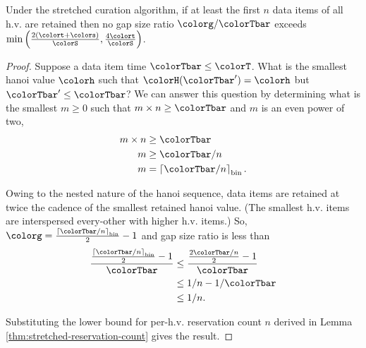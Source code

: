 \begin{theorem}
\label{thm:stretched-gap-size}
Under the stretched curation algorithm, if at least the first $n$ data items of all h.v. are retained then no gap size ratio $\colorg/\colorTbar$ exceeds $\min\Big(
  \frac{2(\colort + \colors)}{\colorS},
  \frac{4\colort}{\colorS}
\Big)$.
\end{theorem}
\begin{proof}

Suppose a data item time $\colorTbar \leq \colorT$.
What is the smallest hanoi value $\colorh$ such that $\colorH(\colorTbar') = \colorh$ but $\colorTbar' \leq \colorTbar$?
We can answer this question by determining what is the smallest $m \geq 0$ such that $m \times n \geq \colorTbar$ and $m$ is an even power of two,
\begin{align*}
m \times n
&\geq \colorTbar\\
m
&\geq \colorTbar / n\\
m
&= \left\lceil \colorTbar / n \right\rceil_{\mathrm{bin}}.
\end{align*}

Owing to the nested nature of the hanoi sequence, data items are retained at twice the cadence of the smallest retained hanoi value.
(The smallest h.v. items are interspersed every-other with higher h.v. items.)
So, $\colorg = \frac{\left\lceil \colorTbar / n \right\rceil_{\mathrm{bin}}}{2} - 1$ and gap size ratio is less than
\begin{align*}
\frac{
\frac{\left\lceil \colorTbar / n \right\rceil_{\mathrm{bin}}}{2} - 1
}{
\colorTbar
}
&\leq
\frac{
\frac{2\colorTbar / n}{2} - 1
}{
\colorTbar
}\\
&\leq
1 / n - 1 / \colorTbar\\
&\leq
1 / n.
\end{align*}

Substituting the lower bound for per-h.v. reservation count $n$ derived in Lemma \ref{thm:stretched-reservation-count} gives the result.
\end{proof}
